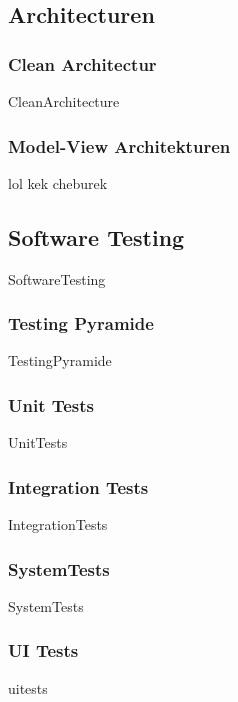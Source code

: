 \documentclass{article}
\begin{document}
    \subsection{Architecturen}
        \subsubsection{Clean Architectur}
            {CleanArchitecture}
        \subsubsection{Model-View Architekturen}
            lol kek cheburek

    \subsection{Software Testing}
        {SoftwareTesting}

        \subsubsection{Testing Pyramide}
            {TestingPyramide}
        
        \subsubsection{Unit Tests}
            {UnitTests}
        
        \subsubsection{Integration Tests}
            {IntegrationTests}

        \subsubsection{SystemTests}
            {SystemTests}

        \subsubsection{UI Tests}
            {uitests}
\end{document}
